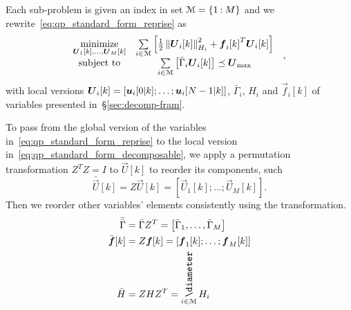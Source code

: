 \documentclass[../main.tex]{subfiles}
\begin{document}
Each sub-problem is given an index in set $\mathcal{M}=\{1\mathbin{:}M\}$ and we rewrite~\eqref{eq:qp_standard_form_reprise} as
\begin{equation}
  \label{eq:qp_standard_form_decomposable}
  \begin{aligned}
    \begin{matrix}
      \mathop{\textrm{minimize}}\limits_{\boldsymbol{U}_{1}[k],\dots, \boldsymbol{U}_{M}[k]} &
      \sum\limits_{i\in\mathcal{M}}\left[\frac{1}{2}\left\lVert\boldsymbol{U}_{i}[k]\right\rVert^{2}_{H_{i}} + {\boldsymbol{f}_{i}[k]}^{T}\boldsymbol{U}_{i}[k]\right]&\\
      \mathrm{subject~ to} & \sum\limits_{i\in\mathcal{M}}\left[\bar{\Gamma}_{i}\boldsymbol{U}_{i}[k]\right] \preceq {\boldsymbol{U}}_{\text{max}}
    \end{matrix}
  \end{aligned},
\end{equation}
with local versions $\boldsymbol{U}_{i}[k]=\left[\boldsymbol{u}_{i}[0|k]; \dots; \boldsymbol{u}_{i}[N-1|k]\right]$, $\bar{\Gamma}_{i}$, $H_{i}$ and $\vec{f}_{i}[k]$ of variables presented in~\S\ref{sec:decomp-fram}.

\begin{remark}
  To pass from the global version of the variables in~\eqref{eq:qp_standard_form_reprise} to the local version in~\ref{eq:qp_standard_form_decomposable}, we apply a permutation transformation $Z^{T}Z=I$ to $\vec{U}[k]$ to reorder its components, such
  \begin{equation}
    \bar{\vec{U}}[k]=Z\vec{U}[k]=\left[\vec{U}_{1}[k]; \dots; \vec{U}_{M}[k]\right].
  \end{equation}
  Then we reorder other variables' elements consistently using the transformation.
  \begin{align}
    \label{eq:1}
    \bar{\bar{\Gamma}}&=\bar{\Gamma}Z^{T}=\left[\bar{\Gamma}_{1}, \dots, \bar{\Gamma}_{M}\right]\\
    \bar{\vec{f}}[k]&=Z\vec{f}[k]=\left[\vec{f}_{1}[k]; \dots; \vec{f}_{M}[k]\right]\\
    \bar{H}&=ZHZ^{T}=\blkdiag\limits_{i\in\set{M}} H_{i}
  \end{align}
\end{remark}
\end{document}
